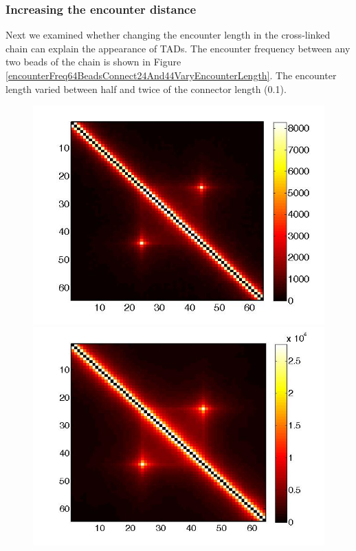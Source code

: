 \documentclass[12pt]{paper}
\begin{document}
\subsubsection{Increasing the encounter distance}
Next we examined whether changing the encounter length in the cross-linked chain can explain the appearance of TADs. The encounter frequency between any two beads of the chain is shown in Figure \ref{encounterFreq64BeadsConnect24And44VaryEncounterLength}. The encounter length varied between half and twice of the connector length (0.1).

\begin{figure}[H]
\includegraphics[scale=0.2]{encounterFrequency64BeadsConnect24And44EncounterDist0_05}
\includegraphics[scale=0.19]{encounterFrequency64BeadsConnect24And44EncounterDist0_1}

\end{figure}
\end{document}
